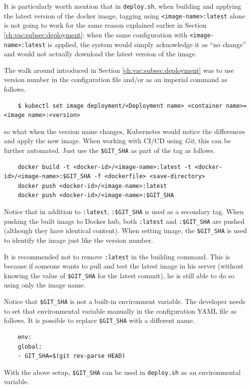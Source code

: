 It is particularly worth mention that in \verb|deploy.sh|, when building and applying the latest version of the docker image, tagging using \verb|<image-name>:latest| alone is not going to work for the same reason explained earlier in Section \ref{ch:vac:subsec:deployment}: when the same configuration with \verb|<image-name>:latest| is applied, the system would simply acknowledge it as ``no change'' and would not actually download the latest version of the image.

The walk around introduced in Section \ref{ch:vac:subsec:deployment} was to use version number in the configuration file and/or as an imperial command as follows.
\begin{lstlisting}
	$ kubectl set image deployment/<Deployment name> <container name>=<image name>:<version>
\end{lstlisting}
so what when the version name changes, Kubernetes would notice the differences and apply the new image. When working with CI/CD using \textit{Git}, this can be further automated. Just use the \verb|$GIT_SHA| as part of the tag as follows.
\begin{lstlisting}
	docker build -t <docker-id>/<image-name>:latest -t <docker-id>/<image-name>:$GIT_SHA -f <dockerfile> <save-directory>
	docker push <docker-id>/<image-name>:latest
	docker push <docker-id>/<image-name>:$GIT_SHA
\end{lstlisting}
Notice that in addition to \verb|:latest|, \verb|:$GIT_SHA| is used as a secondary tag. When pushing the built image to Docker hub, both \verb|:latest| and \verb|:$GIT_SHA| are pushed (although they have identical content). When setting image, the \verb|$GIT_SHA| is used to identify the image just like the version number.

It is recommended not to remove \verb|:latest| in the building command. This is because if someone wants to pull and test the latest image in his server (without knowing the value of \verb|$GIT_SHA| for the latest commit), he is still able to do so using only the image name.

Notice that \verb|$GIT_SHA| is not a built-in environment variable. The developer needs to set that environmental variable manually in the configuration YAML file as follows. It is possible to replace \verb|$GIT_SHA| with a different name.
\begin{lstlisting}
	env:
	global:
	- GIT_SHA=$(git rev-parse HEAD)
\end{lstlisting}
With the above setup, \verb|$GIT_SHA| can be used in \verb|deploy.sh| as an environmental variable.

